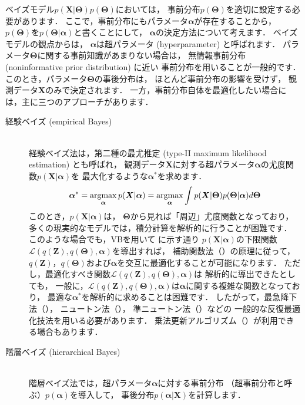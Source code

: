 ベイズモデル$p(\bm{X}|\bm\Theta)p(\bm\Theta)$においては，
事前分布$p(\bm\Theta)$を適切に設定する必要があります．
ここで，事前分布にもパラメータ$\bm\alpha$が存在することから，
$p(\bm\Theta)$を$p(\bm\Theta|\bm\alpha)$と書くことにして，
$\bm\alpha$の決定方法について考えます．
ベイズモデルの観点からは，
$\bm\alpha$は超パラメータ (hyperparameter) と呼ばれます．
パラメータ$\bm\Theta$に関する事前知識があまりない場合は，
無情報事前分布 (noninformative prior distribution) に近い
事前分布を用いることが一般的です．
このとき，パラメータ$\bm\Theta$の事後分布は，
ほとんど事前分布の影響を受けず，
観測データ$\bm{X}$のみで決定されます．
一方，事前分布自体を最適化したい場合には，主に三つのアプローチがあります．
\begin{description}
\item[経験ベイズ (empirical Bayes)] \ \\
経験ベイズ法は，第二種の最尤推定 (type-II maximum likelihood estimation) とも呼ばれ，
観測データ$\bm{X}$に対する超パラメータ$\bm\alpha$の尤度関数$p(\bm{X}|\bm\alpha)$を
最大化するような$\bm\alpha^*$を求めます．
\begin{align}
\bm\alpha^* 
= \argmax_{\bm\alpha} p(\bm{X}|\bm\alpha)
= \argmax_{\bm\alpha} \int p(\bm{X}|\bm\Theta) p(\bm\Theta|\bm\alpha) d\bm\Theta
\label{fig:eb_argmax}
\end{align}
このとき，$p(\bm{X}|\bm\alpha)$は，
$\bm\Theta$から見れば「周辺」尤度関数となっており，
多くの現実的なモデルでは，積分計算を解析的に行うことが困難です．
このような場合でも，VBを用いて
に示す通り
$p(\bm{X}|\bm\alpha)$の下限関数$\mathcal{L}(q(\bm{Z}),q(\bm\Theta),\bm\alpha)$を導出すれば，
補助関数法（）の原理に従って，
$q(\bm{Z})$，$q(\bm\Theta)$および$\bm\alpha$を交互に最適化することが可能になります．
ただし，最適化すべき関数$\mathcal{L}(q(\bm{Z}),q(\bm\Theta),\bm\alpha)$は
解析的に導出できたとしても，
一般に，$\mathcal{L}(q(\bm{Z}),q(\bm\Theta),\bm\alpha)$は$\bm\alpha$に関する複雑な関数となっており，
最適な$\bm\alpha^*$を解析的に求めることは困難です．
したがって，最急降下法（），
ニュートン法（），
準ニュートン法（）などの
一般的な反復最適化技法を用いる必要があります．
乗法更新アルゴリズム（）が利用できる場合もあります．
\item[階層ベイズ (hierarchical Bayes)] \ \\
階層ベイズ法では，超パラメータ$\bm\alpha$に対する事前分布
（超事前分布と呼ぶ）$p(\bm\alpha)$を導入して，
事後分布$p(\bm\alpha|\bm{X})$を計算します．

\end{description}
